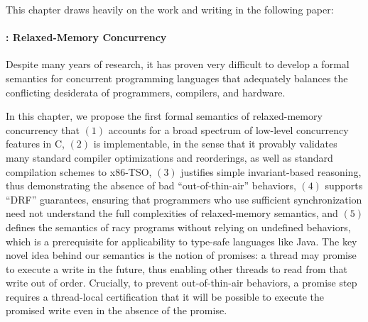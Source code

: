 
This chapter draws heavily on the work and writing in the following paper:


\paragraph{: Relaxed-Memory Concurrency}

Despite many years of research, it has proven very difficult to develop a formal semantics for
concurrent programming languages that adequately balances the conflicting desiderata of programmers,
compilers, and hardware.

In this chapter, we propose the first formal semantics of relaxed-memory concurrency that $(1)$
accounts for a broad spectrum of low-level concurrency features in C, $(2)$ is implementable, in the
sense that it provably validates many standard compiler optimizations and reorderings, as well as
standard compilation schemes to x86-TSO, $(3)$ justifies simple invariant-based reasoning, thus
demonstrating the absence of bad ``out-of-thin-air'' behaviors, $(4)$ supports ``DRF'' guarantees,
ensuring that programmers who use sufficient synchronization need not understand the full
complexities of relaxed-memory semantics, and $(5)$ defines the semantics of racy programs without
relying on undefined behaviors, which is a prerequisite for applicability to type-safe languages
like Java.  The key novel idea behind our semantics is the notion of promises: a thread may promise
to execute a write in the future, thus enabling other threads to read from that write out of order.
Crucially, to prevent out-of-thin-air behaviors, a promise step requires a thread-local
certification that it will be possible to execute the promised write even in the absence of the
promise.

